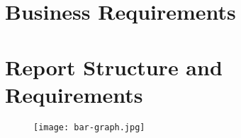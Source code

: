 \section{Business Requirements}
\label{sec:businessreq}
\lipsum[2]
\section{Report Structure and Requirements}
\label{sec:struc&req}
\lipsum[2]
\begin{figure}[ht]
    \centerline{\texttt{[image: bar-graph.jpg]}}
    \end{figure}
    \pagebreak

